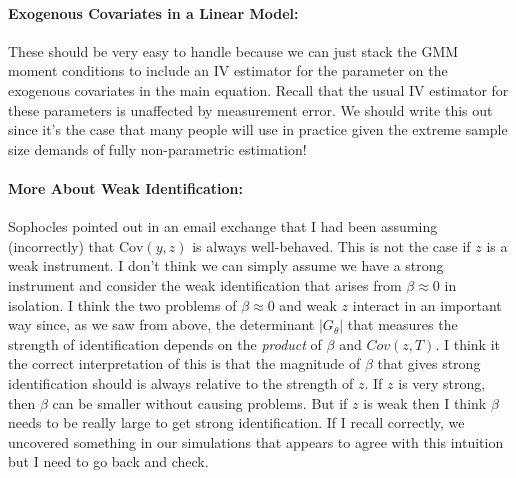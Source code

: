 \documentclass[12pt]{article}
\begin{document}
\paragraph{Exogenous Covariates in a Linear Model:} These should be very easy to handle because we can just stack the GMM moment conditions to include an IV estimator for the parameter on the exogenous covariates in the main equation.
Recall that the usual IV estimator for these parameters is unaffected by measurement error.
We should write this out since it's the case that many people will use in practice given the extreme sample size demands of fully non-parametric estimation!

\paragraph{More About Weak Identification:}
Sophocles pointed out in an email exchange that I had been assuming (incorrectly) that $\mbox{Cov}(y,z)$ is always well-behaved.
This is not the case if $z$ is a weak instrument.
I don't think we can simply assume we have a strong instrument and consider the weak identification that arises from $\beta \approx 0$ in isolation.
I think the two problems of $\beta \approx 0$ and weak $z$ interact in an important way since, as we saw from above, the determinant $|G_\theta|$ that measures the strength of identification depends on the \emph{product} of $\beta$ and $Cov(z,T)$.
I think it the correct interpretation of this is that the magnitude of $\beta$ that gives strong identification should is always relative to the strength of $z$.
If $z$ is very strong, then $\beta$ can be smaller without causing problems.
But if $z$ is weak then I think $\beta$ needs to be really large to get strong identification.
If I recall correctly, we uncovered something in our simulations that appears to agree with this intuition but I need to go back and check.
\end{document}
